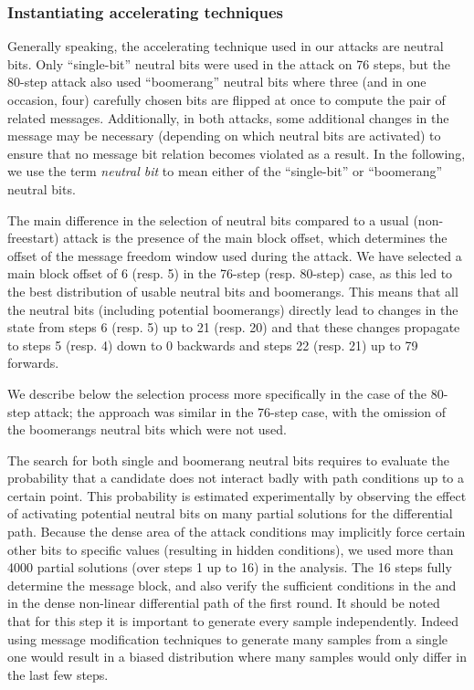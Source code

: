 \subsubsection{Instantiating accelerating techniques}
\label{sec:free_nb}

Generally speaking, the accelerating technique used in our attacks are neutral bits. Only ``single-bit'' neutral bits were used in the attack on 76 steps, but
the 80-step attack also used ``boomerang'' neutral bits where three (and in one occasion, four) carefully chosen bits are flipped at once to compute the
pair of related messages. Additionally, in both attacks, some additional changes in the message may be necessary (depending on which neutral bits are activated)
to ensure that no message bit relation becomes violated as a result. In the following, we use the term \emph{neutral bit} to mean either of the ``single-bit''
or ``boomerang'' neutral bits.

The main difference in the selection of neutral bits compared to a usual (non-freestart) attack is the presence of the main block offset, which
determines the offset of the message freedom window used during the attack.
We have selected a main block offset of 6 (resp. 5) in the 76-step (resp. 80-step) case, as this led to the best distribution of usable neutral bits and boomerangs.
This means that all the neutral bits (including potential boomerangs) directly lead to changes in the state from steps 6 (resp. 5) up to 21 (resp. 20) and that these changes propagate to steps 5 (resp. 4) down to 0 backwards and steps
22 (resp. 21) up to 79 forwards.

We describe below the selection process more specifically in the case of the 80-step attack; the approach was similar in the 76-step case, with the omission of the boomerangs neutral bits which were not used.

\medskip

The search for both single and boomerang neutral bits requires to evaluate the probability that a candidate does not interact badly with path conditions up to a certain point.
This probability is estimated experimentally by observing the effect of activating potential neutral bits on many partial solutions for the differential path.
Because the dense area of the attack conditions may implicitly force certain other bits to specific values (resulting in hidden conditions),
we used more than 4000 partial solutions (over steps 1 up to 16) in the analysis.
The 16 steps fully determine the message block, and also verify the sufficient conditions in the \iv and in the dense non-linear differential path of the first round.
It should be noted that for this step it is important to generate every sample independently.
Indeed using \eg{} message modification techniques to generate many samples from a single one would result in a biased distribution where many samples would only differ in the last few steps.

